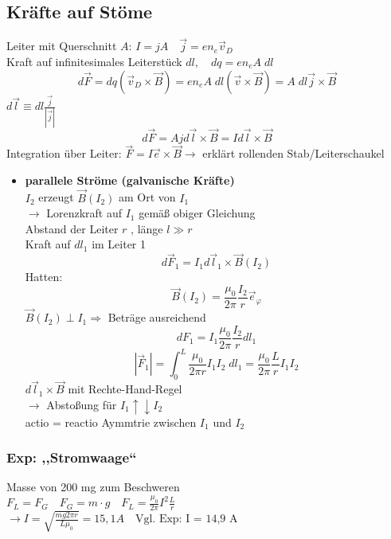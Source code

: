 \documentclass[titlepage,12pt,a4paper,ngerman]{report}
\newcommand{\tx}[1]{\textrm{#1}}
\begin{document}
\subsection{Kräfte auf Stöme}
Leiter mit Querschnitt $ A $: $ I = j A \quad \vec{j} = e n_e \vec{v}_D $\\
Kraft auf infinitesimales Leiterstück $ dl, \quad dq = e n_e A \; dl $\\
$$ d\vec{F} = dq (\vec{v}_D \times \vec{B}) = e n_e A\; dl (\vec{v} \times \vec{B}) = A \; dl \vec{j} \times \vec{B} $$
$ d\vec{l} \equiv dl \frac{\vec{j}}{| \vec{j} |}$\\
$$ d\vec{F} = A j d\vec{l} \times \vec{B} = I d\vec{l} \times \vec{B} $$
Integration über Leiter: $ \vec{F} = I \vec{e} \times \vec{B} \rightarrow $ erklärt rollenden Stab/Leiterschaukel\\
\begin{itemize}
	\item \textbf{parallele Ströme (galvanische Kräfte)}\\
	$ I_2 $ erzeugt $ \vec{B} (I_2) $ am Ort von $ I_1 $\\
	$ \rightarrow $ Lorenzkraft auf $ I_1 $ gemäß obiger Gleichung\\
	Abstand der Leiter $ r $ , länge $ l \gg r $\\
	Kraft auf $  dl_1 $ im Leiter 1\\
	$$ d\vec{F}_1  = I_1 d\vec{l}_1 \times \vec{B}(I_2) $$
	Hatten: $$ \vec{B}(I_2) = \frac{\mu_0}{2 \pi} \frac{I_2}{r} \vec{e}_\varphi $$
	$ \vec{B} (I_2) \perp I_1 \Rightarrow $ Beträge ausreichend\\
	$$ dF_1 = I_1 \frac{ \mu_0}{2 \pi} \frac{I_2}{r} dl_1 $$
	$$\boxed{ |\vec{F}_1 | = \int_0 ^L \frac{\mu _0}{2 \pi r } I_1 I_2 \; dl_1 = \frac{\mu_0}{2 \pi} \frac{L}{r} I_1 I_2}$$
	$ d\vec{l}_1 \times \vec{B} $ mit Rechte-Hand-Regel\\
	$ \rightarrow $ Abstoßung für $ I_1 \uparrow \downarrow I_2 $\\
	actio = reactio Aymmtrie zwischen $ I_1 $ und $ I_2 $ \\
\end{itemize}
\subsubsection{Exp: ,,Stromwaage``} 
Masse von 200 mg zum Beschweren\\
$ F_L = F_G \quad F_G = m \cdot g \quad F_L = \frac{\mu_0}{2 \pi} I^2 \frac{L}{r} $\\
$ \rightarrow I = \sqrt{\frac{mg 2 \pi r}{L \mu_0}}  = 15,1 A  \quad \tx{Vgl. Exp: I = 14,9 A }$
\end{document}
